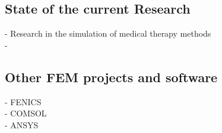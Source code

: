 \documentclass[parskip=half, titlepage=yes, 12pt, BCOR=12mm, DIV=calc]{scrartcl}
\begin{document}
\subsection{State of the current Research}
- Research in the simulation of medical therapy methods \\
- 


\subsection{Other FEM projects and software}

- FENICS \\
- COMSOL \\
- ANSYS \\

\newpage


\clearpage
\nocite{*}
\printbibliography

\newpage

\appendix

 
\end{document}
